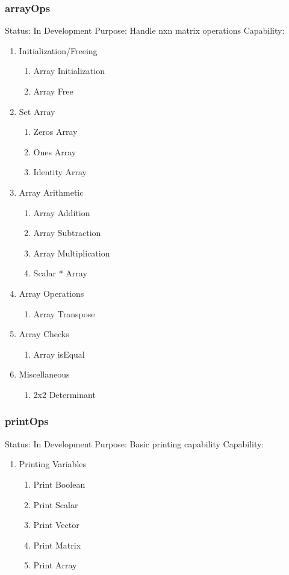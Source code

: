 \documentclass{article}
\begin{document}
			\subsubsection{arrayOps}
				Status: In Development \newline
				Purpose: Handle nxn matrix operations \newline
				Capability: 
				\begin{enumerate}
				\item Initialization/Freeing
				\begin{enumerate}
					\item Array Initialization
					\item Array Free
				\end{enumerate}
				\item Set Array
				\begin{enumerate}
					\item Zeros Array
					\item Ones Array
					\item Identity Array
				\end{enumerate}
				\item Array Arithmetic
				\begin{enumerate}
					\item Array Addition
					\item Array Subtraction
					\item Array Multiplication
					\item Scalar * Array
				\end{enumerate}
				\item Array Operations
				\begin{enumerate}
					\item Array Transpose
				\end{enumerate}
				\item Array Checks
				\begin{enumerate}
					\item Array isEqual
				\end{enumerate}
				\item Miscellaneous
				\begin{enumerate}
					\item 2x2 Determinant
				\end{enumerate}
			\end{enumerate}
			\subsubsection{printOps}
				Status: In Development
				Purpose: Basic printing capability
				Capability:
				\begin{enumerate}
					\item Printing Variables
					\begin{enumerate}
						\item Print Boolean
						\item Print Scalar
						\item Print Vector
						\item Print Matrix
						\item Print Array
					\end{enumerate}
				\end{enumerate}
\end{document}
